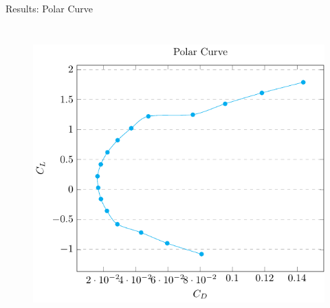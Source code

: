 \documentclass[english,10pt,a4paper,twoside]{beamer}
\begin{document}
\begin{frame}[shrink = 65]{Results: Polar Curve}
\begin{columns}[T]
			\begin{figure}[H]
				\centering
				\includegraphics[width=0.8\linewidth]{"figures/plar curve nnlineartex"}
				\label{fig:plar-curve-nnlineartex}
			\end{figure}						
		\end{columns}
	\end{frame}
	
\end{document}
